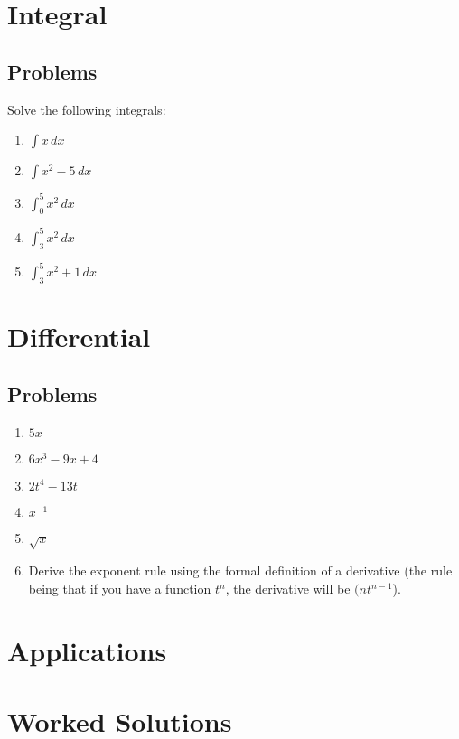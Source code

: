 \documentclass[12pt]{article}
\begin{document}
\section{Integral}



\subsection{Problems}
Solve the following integrals:

\begin{enumerate}
    \item $\int x \, dx$
    \item $\int x^2-5 \, dx$
    \item $\int^5_0 x^2 \, dx$
    \item $\int^5_3 x^2 \, dx$
    \item $\int^5_3 x^2 + 1 \, dx$
\end{enumerate}

\section{Differential}



\subsection{Problems}
\begin{enumerate}
    \item $5x$
    \item $6x^3 - 9x + 4$
    \item $2t^4 - 13t$
    \item $x^{-1}$
    \item $\sqrt{x}$
    \item Derive the exponent rule using the formal definition of a derivative (the rule being that if you have a function $t^n$, the derivative will be $(nt^{n-1}$).
\end{enumerate}

\section{Applications}



\medskip

\section{Worked Solutions}
\end{document}
